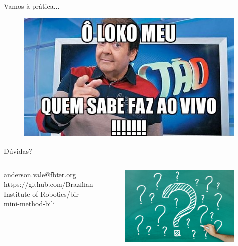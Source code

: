 \begin{frame}{Vamos à prática...}
	\begin{figure}[hb]
		\includegraphics[width=1\textwidth]{figures/faustao.jpg}
	\end{figure}
\end{frame}

\begin{frame}{Dúvidas?}
	\begin{columns}
		anderson.vale@fbter.org
		https://github.com/Brazilian-Institute-of-Robotics/bir-mini-method-bili

		\begin{figure}[hb]
      		\includegraphics[width=1\textwidth]{figures/duvida.jpg}
		\end{figure}
	\end{columns}
\end{frame}